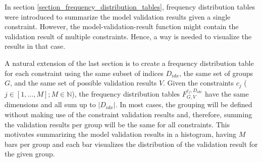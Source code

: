 In section \ref{section_frequency_distribution_tables}, frequency distribution tables were introduced to summarize the model validation results given a single constraint. However, the model-validation-result function might contain the validation result of multiple constraints. Hence, a way is needed to visualize the results in that case.

A natural extension of the last section is to create a frequency distribution table for each constraint using the same subset of indices $D_{idx}$, the same set of groups $G$, and the same set of possible validation results $V$. Given the constraints $c_j$ ($j \in [1,...,M]; M \in \mathbb{N}$), the frequency distribution tables $F_{G,V}^{c_j,D_{idx}}$ have the same dimensions and all sum up to $|D_{idx}|$. In most cases, the grouping will be defined without making use of the constraint validation results and, therefore, summing the validation results per group will be the same for all constraints. This motivates summarizing the model validation results in a histogram, having $M$ bars per group and each bar visualizes the distribution of the validation result for the given group.

